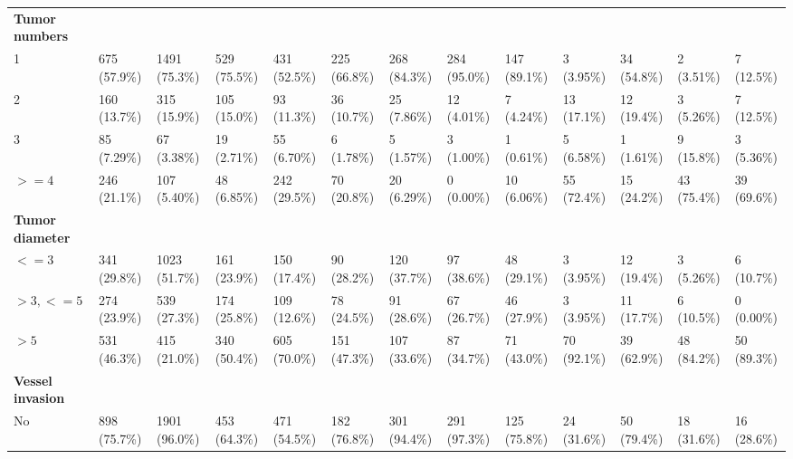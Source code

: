 \documentclass{article}
\begin{document}
\begin{landscape}
\begin{tiny}
\begin{tabularx}{\linewidth}{p{2.0cm}|X|X|X|X|X|X|X|X|X|X|X|X}
\rowcolor{gray!30}
\textbf{Tumor numbers }  &  &  &  &  &  &  &  &  &  &  &  &  \\
\rowcolor{gray!10}
    1 &   675 (57.9\%)    &   1491 (75.3\%)   &   529 (75.5\%)    &   431 (52.5\%)    &   225 (66.8\%)    &   268 (84.3\%)    &   284 (95.0\%)    &   147 (89.1\%)    &    3 (3.95\%)     &    34 (54.8\%)    &    2 (3.51\%)     &    7 (12.5\%)     \\
\rowcolor{gray!10}
    2 &   160 (13.7\%)    &   315 (15.9\%)    &   105 (15.0\%)    &    93 (11.3\%)    &    36 (10.7\%)    &    25 (7.86\%)    &    12 (4.01\%)    &    7 (4.24\%)     &    13 (17.1\%)    &    12 (19.4\%)    &    3 (5.26\%)     &    7 (12.5\%)     \\
\rowcolor{gray!10}
    3 &    85 (7.29\%)    &    67 (3.38\%)    &    19 (2.71\%)    &    55 (6.70\%)    &    6 (1.78\%)     &    5 (1.57\%)     &    3 (1.00\%)     &    1 (0.61\%)     &    5 (6.58\%)     &    1 (1.61\%)     &    9 (15.8\%)     &    3 (5.36\%)     \\
\rowcolor{gray!10}
    $>=4$ &   246 (21.1\%)    &   107 (5.40\%)    &    48 (6.85\%)    &   242 (29.5\%)    &    70 (20.8\%)    &    20 (6.29\%)    &    0 (0.00\%)     &    10 (6.06\%)    &    55 (72.4\%)    &    15 (24.2\%)    &    43 (75.4\%)    &    39 (69.6\%)    \\
\rowcolor{gray!30}
\textbf{Tumor diameter }  &  &  &  &  &  &  &  &  &  &  &  &  \\
\rowcolor{gray!10}
    $<=3$ &   341 (29.8\%)    &   1023 (51.7\%)   &   161 (23.9\%)    &   150 (17.4\%)    &    90 (28.2\%)    &   120 (37.7\%)    &    97 (38.6\%)    &    48 (29.1\%)    &    3 (3.95\%)     &    12 (19.4\%)    &    3 (5.26\%)     &    6 (10.7\%)     \\
\rowcolor{gray!10}
    $>3, <=5$ &   274 (23.9\%)    &   539 (27.3\%)    &   174 (25.8\%)    &   109 (12.6\%)    &    78 (24.5\%)    &    91 (28.6\%)    &    67 (26.7\%)    &    46 (27.9\%)    &    3 (3.95\%)     &    11 (17.7\%)    &    6 (10.5\%)     &    0 (0.00\%)     \\
\rowcolor{gray!10}
    $>5$ &   531 (46.3\%)    &   415 (21.0\%)    &   340 (50.4\%)    &   605 (70.0\%)    &   151 (47.3\%)    &   107 (33.6\%)    &    87 (34.7\%)    &    71 (43.0\%)    &    70 (92.1\%)    &    39 (62.9\%)    &    48 (84.2\%)    &    50 (89.3\%)    \\
\rowcolor{gray!30}
\textbf{Vessel invasion }  &  &  &  &  &  &  &  &  &  &  &  &  \\
\rowcolor{gray!10}
    No &   898 (75.7\%)    &   1901 (96.0\%)   &   453 (64.3\%)    &   471 (54.5\%)    &   182 (76.8\%)    &   301 (94.4\%)    &   291 (97.3\%)    &   125 (75.8\%)    &    24 (31.6\%)    &    50 (79.4\%)    &    18 (31.6\%)    &    16 (28.6\%)    \\

\end{tabularx}
\end{tiny}
\end{landscape}
\end{document}
